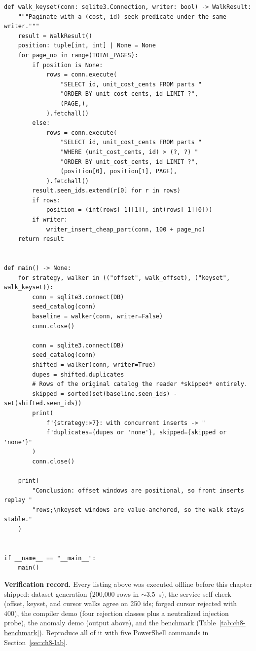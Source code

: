 \begin{verbatim}
def walk_keyset(conn: sqlite3.Connection, writer: bool) -> WalkResult:
    """Paginate with a (cost, id) seek predicate under the same writer."""
    result = WalkResult()
    position: tuple[int, int] | None = None
    for page_no in range(TOTAL_PAGES):
        if position is None:
            rows = conn.execute(
                "SELECT id, unit_cost_cents FROM parts "
                "ORDER BY unit_cost_cents, id LIMIT ?",
                (PAGE,),
            ).fetchall()
        else:
            rows = conn.execute(
                "SELECT id, unit_cost_cents FROM parts "
                "WHERE (unit_cost_cents, id) > (?, ?) "
                "ORDER BY unit_cost_cents, id LIMIT ?",
                (position[0], position[1], PAGE),
            ).fetchall()
        result.seen_ids.extend(r[0] for r in rows)
        if rows:
            position = (int(rows[-1][1]), int(rows[-1][0]))
        if writer:
            writer_insert_cheap_part(conn, 100 + page_no)
    return result


def main() -> None:
    for strategy, walker in (("offset", walk_offset), ("keyset", walk_keyset)):
        conn = sqlite3.connect(DB)
        seed_catalog(conn)
        baseline = walker(conn, writer=False)
        conn.close()

        conn = sqlite3.connect(DB)
        seed_catalog(conn)
        shifted = walker(conn, writer=True)
        dupes = shifted.duplicates
        # Rows of the original catalog the reader *skipped* entirely.
        skipped = sorted(set(baseline.seen_ids) - set(shifted.seen_ids))
        print(
            f"{strategy:>7}: with concurrent inserts -> "
            f"duplicates={dupes or 'none'}, skipped={skipped or 'none'}"
        )
        conn.close()

    print(
        "Conclusion: offset windows are positional, so front inserts replay "
        "rows;\nkeyset windows are value-anchored, so the walk stays stable."
    )


if __name__ == "__main__":
    main()
\end{verbatim}

\begin{examplebox}
\textbf{Verification record.} Every listing above was executed offline
before this chapter shipped: dataset generation (200{,}000 rows in
${\sim}3.5$~s), the service self-check (offset, keyset, and cursor walks
agree on 250 ids; forged cursor rejected with 400), the compiler demo (four
rejection classes plus a neutralized injection probe), the anomaly demo
(output above), and the benchmark (Table~\ref{tab:ch8-benchmark}). Reproduce
all of it with five PowerShell commands in Section~\ref{sec:ch8-lab}.
\end{examplebox}

